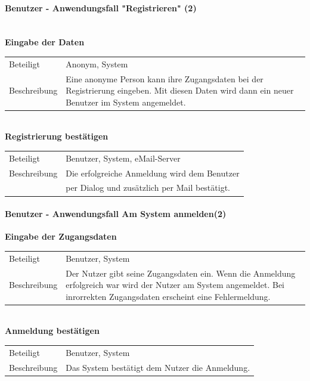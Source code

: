 \documentclass[12pt,a4paper]{article}
\begin{document}
\paragraph{Benutzer - Anwendungsfall "Registrieren" (2)}\mbox{}\\
\textbf{Eingabe der Daten}\\
\begin{tabular}{l| p{12cm}}
\hline 
Beteiligt & Anonym, System \\ 
Beschreibung & Eine anonyme Person kann ihre Zugangsdaten bei der Registrierung eingeben. Mit diesen Daten wird dann ein neuer Benutzer im System angemeldet.\\ 
\end{tabular}\\

\textbf{Registrierung bestätigen}\\
\begin{tabular}{l|p{12cm}}
\hline 
Beteiligt    & Benutzer, System, eMail-Server \\ 
Beschreibung & Die erfolgreiche Anmeldung wird dem Benutzer  \\
 			 & per Dialog und zusätzlich per Mail bestätigt. \\ 
\end{tabular} 

\newpage
\paragraph{Benutzer - Anwendungsfall \glqq Am System anmelden\grqq (2)}\mbox{}

\textbf{Eingabe der Zugangsdaten}\\
\begin{tabular}{l|p{12cm}}
\hline 
Beteiligt & Benutzer, System \\ 
Beschreibung & Der Nutzer gibt seine Zugangsdaten ein. Wenn die Anmeldung erfolgreich war wird der Nutzer am System angemeldet. Bei inrorrekten Zugangsdaten erscheint eine Fehlermeldung. \\ 
\end{tabular}\\


\textbf{Anmeldung bestätigen}\\
\begin{tabular}{l|p{12cm}}
\hline 
Beteiligt & Benutzer, System \\ 
Beschreibung & Das System bestätigt dem Nutzer die Anmeldung. \\ 
\end{tabular}\\\\
\end{document}
